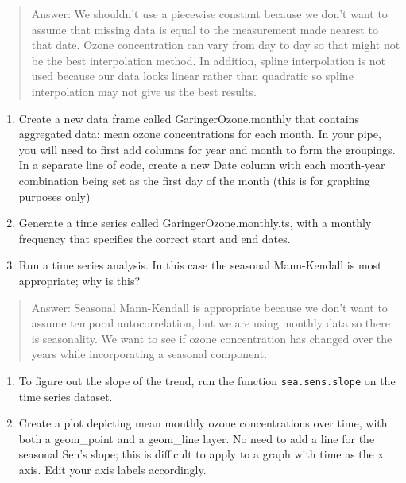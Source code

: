 \documentclass[]{article}
\begin{document}
\begin{quote}
Answer: We shouldn't use a piecewise constant because we don't want to
assume that missing data is equal to the measurement made nearest to
that date. Ozone concentration can vary from day to day so that might
not be the best interpolation method. In addition, spline interpolation
is not used because our data looks linear rather than quadratic so
spline interpolation may not give us the best results.
\end{quote}

\begin{enumerate}
\def\labelenumi{\arabic{enumi}.}
\setcounter{enumi}{8}
\item
  Create a new data frame called GaringerOzone.monthly that contains
  aggregated data: mean ozone concentrations for each month. In your
  pipe, you will need to first add columns for year and month to form
  the groupings. In a separate line of code, create a new Date column
  with each month-year combination being set as the first day of the
  month (this is for graphing purposes only)
\item
  Generate a time series called GaringerOzone.monthly.ts, with a monthly
  frequency that specifies the correct start and end dates.
\item
  Run a time series analysis. In this case the seasonal Mann-Kendall is
  most appropriate; why is this?
\end{enumerate}

\begin{quote}
Answer: Seasonal Mann-Kendall is appropriate because we don't want to
assume temporal autocorrelation, but we are using monthly data so there
is seasonality. We want to see if ozone concentration has changed over
the years while incorporating a seasonal component.
\end{quote}

\begin{enumerate}
\def\labelenumi{\arabic{enumi}.}
\setcounter{enumi}{11}
\item
  To figure out the slope of the trend, run the function
  \texttt{sea.sens.slope} on the time series dataset.
\item
  Create a plot depicting mean monthly ozone concentrations over time,
  with both a geom\_point and a geom\_line layer. No need to add a line
  for the seasonal Sen's slope; this is difficult to apply to a graph
  with time as the x axis. Edit your axis labels accordingly.
\end{enumerate}
\end{document}

